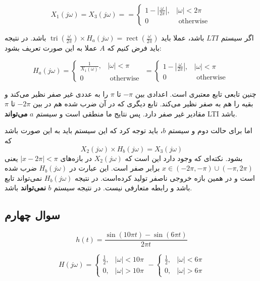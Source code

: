 \documentclass[12pt]{article}
\begin{document}
$$X_1 (j\omega) = X_3(j\omega) ==\left\{\begin{array}{ll}
	1-|\frac{\omega}{2\pi}|, & |\omega|<2\pi \\
	0 & \text { otherwise }
\end{array}\right. $$

اگر سیستم $LTI$ باشد، عملا باید
$\operatorname{tri}(\frac{\omega}{2\pi}) \times H_a(j\omega) =
\operatorname{rect}(\frac{\omega}{2\pi})$
باشد. در نتیجه باید فرض کنیم که $A$ عملا به این صورت تعریف بشود:

$$H_a(j\omega)=\left\{\begin{array}{ll}
 \frac{1}{X_1 (\omega)}, & |\omega|<\pi \\
	0 & \text { otherwise }
\end{array}\right. = \left\{\begin{array}{ll}
1-|\frac{\omega}{2\pi}|, & |\omega|<\pi \\
0 & \text { otherwise }
\end{array}\right. 
$$

چنین تابعی تابع معتبری است. اعدادی بین $-\pi$ تا $\pi$ را به عددی غیر صفر نظیر می‌کند و بقیه را هم به صفر نظیر می‌کند. تابع دیگری که در آن ضرب شده هم در بین $-2\pi$ تا $\pi$ مقادیر غیر صفر دارد. پس نتایج ما منطقی است و سیستم $a$ \textbf{می‌تواند} LTI باشد.

اما برای حالت دوم و سیستم $b$، باید توجه کرد که این سیستم باید به این صورت باشد که
$$X_2(j\omega )\times H_b(j\omega) = X_3(j\omega)$$ 
بشود. نکته‌ای که وجود دارد این است که $X_2(j\omega)$ در بازه‌های 
$|x-2\pi|<\pi$
یعنی
$x\in (-2\pi , -\pi) \cup (-\pi , 2\pi)$
برابر صفر است. این عبارت در $H_b(j\omega)$ ضرب شده است و در همین بازه خروجی ناصفر تولید کرده‌است. در نتیجه $H_b(j\omega)$ نمی‌تواند تابع باشد و رابطه متعارفی نیست. در نتیجه سیستم $b$ \textbf{نمی‌تواند}  باشد.



\newpage

\subsection{سوال چهارم}

$$h(t)=\frac{\sin (10 \pi  t)-\sin (6 \pi  t)}{2 \pi  t}$$

$$H(j\omega) = 
\left\{\begin{array}{ll}
	\frac{1}{2}, & |\omega|<10\pi \\
	0, & |\omega|>10\pi
\end{array}\right.
 -
 \left\{\begin{array}{ll}
 	\frac{1}{2}, & |\omega|<6\pi \\
 	0, & |\omega|>6\pi
 \end{array}\right.
 $$
 
\end{document}
